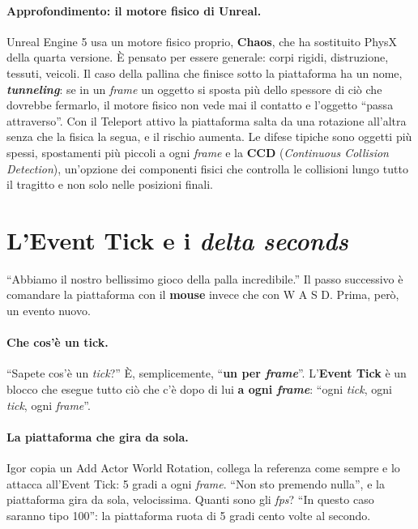 \paragraph{Approfondimento: il motore fisico di Unreal.} Unreal Engine 5 usa un motore
fisico proprio, \textbf{Chaos}, che ha sostituito PhysX della quarta versione. È pensato
per essere generale: corpi rigidi, distruzione, tessuti, veicoli. Il caso della pallina
che finisce sotto la piattaforma ha un nome, \textbf{\emph{tunneling}}: se in un
\emph{frame} un oggetto si sposta più dello spessore di ciò che dovrebbe fermarlo, il
motore fisico non vede mai il contatto e l'oggetto ``passa attraverso''. Con il Teleport
attivo la piattaforma salta da una rotazione all'altra senza che la fisica la segua, e
il rischio aumenta. Le difese tipiche sono oggetti più spessi, spostamenti più piccoli a
ogni \emph{frame} e la \textbf{CCD} (\emph{Continuous Collision Detection}), un'opzione
dei componenti fisici che controlla le collisioni lungo tutto il tragitto e non solo
nelle posizioni finali.

\section{L'Event Tick e i \emph{delta seconds}}
\label{ue2:sec:tick}

``Abbiamo il nostro bellissimo gioco della palla incredibile.'' Il passo successivo è
comandare la piattaforma con il \textbf{mouse} invece che con W A S D. Prima, però, un
evento nuovo.

\paragraph{Che cos'è un tick.} ``Sapete cos'è un \emph{tick}?'' È, semplicemente,
``\textbf{un per \emph{frame}}''. L'\textbf{Event Tick} è un blocco che esegue tutto ciò
che c'è dopo di lui \textbf{a ogni \emph{frame}}: ``ogni \emph{tick}, ogni \emph{tick},
ogni \emph{frame}''.

\paragraph{La piattaforma che gira da sola.} Igor copia un Add Actor World Rotation,
collega la referenza come sempre e lo attacca all'Event Tick: 5 gradi a ogni
\emph{frame}. ``Non sto premendo nulla'', e la piattaforma gira da sola, velocissima.
Quanti sono gli \emph{fps}? ``In questo caso saranno tipo 100'': la piattaforma ruota di 5
gradi cento volte al secondo.

